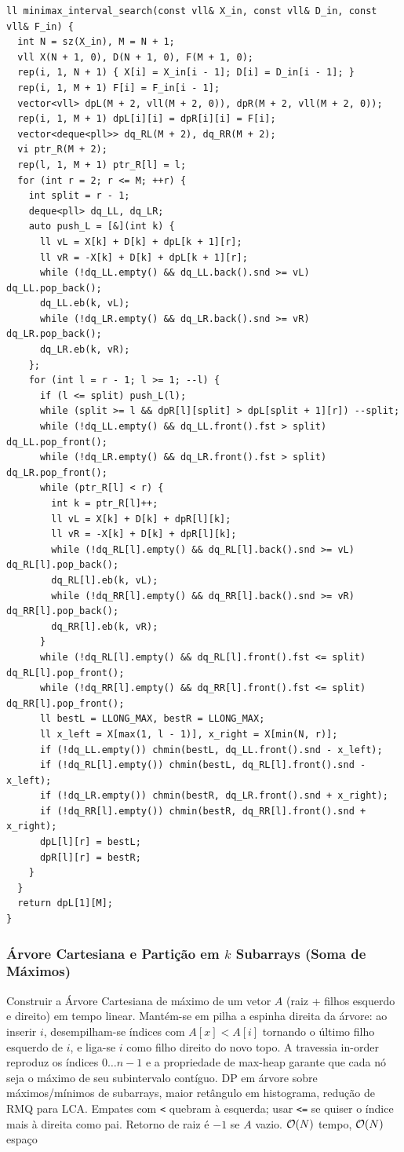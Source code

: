 \begin{lstlisting}
ll minimax_interval_search(const vll& X_in, const vll& D_in, const vll& F_in) {
  int N = sz(X_in), M = N + 1;
  vll X(N + 1, 0), D(N + 1, 0), F(M + 1, 0);
  rep(i, 1, N + 1) { X[i] = X_in[i - 1]; D[i] = D_in[i - 1]; }
  rep(i, 1, M + 1) F[i] = F_in[i - 1];
  vector<vll> dpL(M + 2, vll(M + 2, 0)), dpR(M + 2, vll(M + 2, 0));
  rep(i, 1, M + 1) dpL[i][i] = dpR[i][i] = F[i];
  vector<deque<pll>> dq_RL(M + 2), dq_RR(M + 2);
  vi ptr_R(M + 2);
  rep(l, 1, M + 1) ptr_R[l] = l;
  for (int r = 2; r <= M; ++r) {
    int split = r - 1;
    deque<pll> dq_LL, dq_LR;
    auto push_L = [&](int k) {
      ll vL = X[k] + D[k] + dpL[k + 1][r];
      ll vR = -X[k] + D[k] + dpL[k + 1][r];
      while (!dq_LL.empty() && dq_LL.back().snd >= vL) dq_LL.pop_back();
      dq_LL.eb(k, vL);
      while (!dq_LR.empty() && dq_LR.back().snd >= vR) dq_LR.pop_back();
      dq_LR.eb(k, vR);
    };
    for (int l = r - 1; l >= 1; --l) {
      if (l <= split) push_L(l);
      while (split >= l && dpR[l][split] > dpL[split + 1][r]) --split;
      while (!dq_LL.empty() && dq_LL.front().fst > split) dq_LL.pop_front();
      while (!dq_LR.empty() && dq_LR.front().fst > split) dq_LR.pop_front();
      while (ptr_R[l] < r) {
        int k = ptr_R[l]++;
        ll vL = X[k] + D[k] + dpR[l][k];
        ll vR = -X[k] + D[k] + dpR[l][k];
        while (!dq_RL[l].empty() && dq_RL[l].back().snd >= vL) dq_RL[l].pop_back();
        dq_RL[l].eb(k, vL);
        while (!dq_RR[l].empty() && dq_RR[l].back().snd >= vR) dq_RR[l].pop_back();
        dq_RR[l].eb(k, vR);
      }
      while (!dq_RL[l].empty() && dq_RL[l].front().fst <= split) dq_RL[l].pop_front();
      while (!dq_RR[l].empty() && dq_RR[l].front().fst <= split) dq_RR[l].pop_front();
      ll bestL = LLONG_MAX, bestR = LLONG_MAX;
      ll x_left = X[max(1, l - 1)], x_right = X[min(N, r)];
      if (!dq_LL.empty()) chmin(bestL, dq_LL.front().snd - x_left);
      if (!dq_RL[l].empty()) chmin(bestL, dq_RL[l].front().snd - x_left);
      if (!dq_LR.empty()) chmin(bestR, dq_LR.front().snd + x_right);
      if (!dq_RR[l].empty()) chmin(bestR, dq_RR[l].front().snd + x_right);
      dpL[l][r] = bestL;
      dpR[l][r] = bestR;
    }
  }
  return dpL[1][M];
}
\end{lstlisting}

\subsubsection{Árvore Cartesiana e Partição em $k$ Subarrays (Soma de Máximos)}
\algobox
  {Construir a Árvore Cartesiana de máximo de um vetor $A$ (raiz + filhos esquerdo e direito) em tempo linear.}
  {Mantém-se em pilha a espinha direita da árvore: ao inserir $i$, desempilham-se índices com $A[x] < A[i]$ tornando o último filho esquerdo de $i$, e liga-se $i$ como filho direito do novo topo.}
  {A travessia in-order reproduz os índices $0 \dots n-1$ e a propriedade de max-heap garante que cada nó seja o máximo de seu subintervalo contíguo.}
  {DP em árvore sobre máximos/mínimos de subarrays, maior retângulo em histograma, redução de RMQ para LCA.}
  {Empates com \texttt{<} quebram à esquerda; usar \texttt{<=} se quiser o índice mais à direita como pai. Retorno de raiz é $-1$ se $A$ vazio.}
  {$\mathcal{O}(N)$ tempo, $\mathcal{O}(N)$ espaço}

